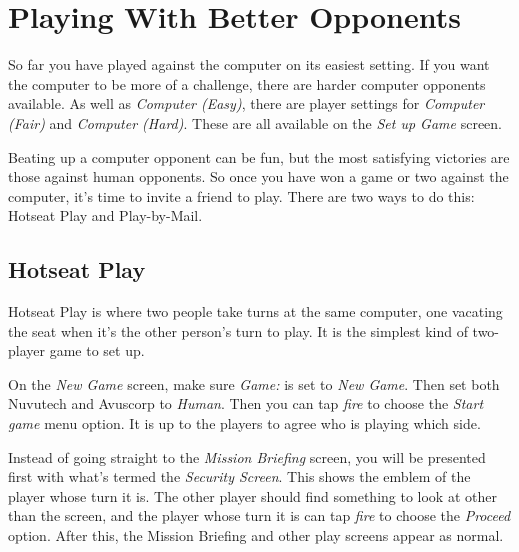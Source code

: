 %
%
%
%

\chapter{Playing With Better Opponents}

\noindent
So far you have played against the computer on its easiest setting. If you want the computer to be more of a challenge, there are harder computer opponents available. As well as {\it Computer (Easy)}, there are player settings for {\it Computer (Fair)} and {\it Computer (Hard)}. These are all available on the {\it Set up Game} screen.

Beating up a computer opponent can be fun, but the most satisfying victories are those against human opponents. So once you have won a game or two against the computer, it's time to invite a friend to play. There are two ways to do this: Hotseat Play and Play-by-Mail.

\section{Hotseat Play}

\noindent
Hotseat Play is where two people take turns at the same computer, one vacating the seat when it's the other person's turn to play. It is the simplest kind of two-player game to set up.

On the {\it New Game} screen, make sure {\it Game:} is set to {\it New Game}. Then set both Nuvutech and Avuscorp to {\it Human}. Then you can tap {\it fire} to choose the {\it Start game} menu option. It is up to the players to agree who is playing which side.

Instead of going straight to the {\it Mission Briefing} screen, you will be presented first with what's termed the {\it Security Screen}. This shows the emblem of the player whose turn it is. The other player should find something to look at other than the screen, and the player whose turn it is can tap {\it fire} to choose the {\it Proceed} option. After this, the Mission Briefing and other play screens appear as normal.

